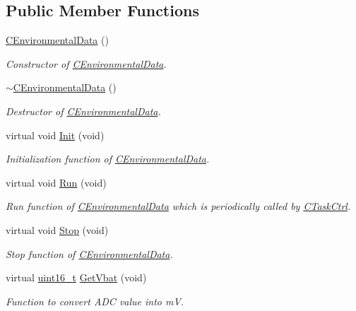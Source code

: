 \subsection*{Public Member Functions}
\begin{DoxyCompactItemize}
\item 
\mbox{\hyperlink{class_c_environmental_data_a93b5c52fc18b109c6f1de9d3a5007033}{C\+Environmental\+Data}} ()
\begin{DoxyCompactList}\small\item\em Constructor of \mbox{\hyperlink{class_c_environmental_data}{C\+Environmental\+Data}}. \end{DoxyCompactList}\item 
\mbox{\hyperlink{class_c_environmental_data_a9ec6952d01bbc0b5813889237535b71d}{$\sim$\+C\+Environmental\+Data}} ()
\begin{DoxyCompactList}\small\item\em Destructor of \mbox{\hyperlink{class_c_environmental_data}{C\+Environmental\+Data}}. \end{DoxyCompactList}\item 
virtual void \mbox{\hyperlink{class_c_environmental_data_a3321cce122ef1e1f7e995ee51353e87d}{Init}} (void)
\begin{DoxyCompactList}\small\item\em Initialization function of \mbox{\hyperlink{class_c_environmental_data}{C\+Environmental\+Data}}. \end{DoxyCompactList}\item 
virtual void \mbox{\hyperlink{class_c_environmental_data_a586a729d3aab2873812517d950c91242}{Run}} (void)
\begin{DoxyCompactList}\small\item\em Run function of \mbox{\hyperlink{class_c_environmental_data}{C\+Environmental\+Data}} which is periodically called by \mbox{\hyperlink{class_c_task_ctrl}{C\+Task\+Ctrl}}. \end{DoxyCompactList}\item 
virtual void \mbox{\hyperlink{class_c_environmental_data_a61a8f487f013602aab4dadcf8a9da4c8}{Stop}} (void)
\begin{DoxyCompactList}\small\item\em Stop function of \mbox{\hyperlink{class_c_environmental_data}{C\+Environmental\+Data}}. \end{DoxyCompactList}\item 
virtual \mbox{\hyperlink{_a_d_a_s___types_8h_a1f1825b69244eb3ad2c7165ddc99c956}{uint16\+\_\+t}} \mbox{\hyperlink{class_c_environmental_data_a12a6d60a2a0aa406beb82375fa60e875}{Get\+Vbat}} (void)
\begin{DoxyCompactList}\small\item\em Function to convert A\+DC value into mV. \end{DoxyCompactList}\end{DoxyCompactItemize}


